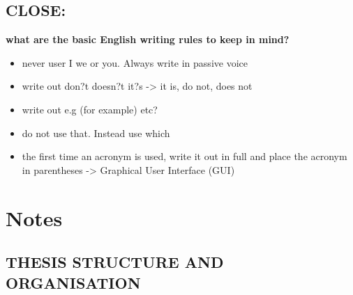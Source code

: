 \section{CLOSE:}
\textbf{what are the basic English writing rules to keep in mind?}\\
\begin{itemize}
\item never user I we or you. Always write in passive voice
\item write out don?t doesn?t it?s -> it is, do not, does not
\item write out e.g (for example) etc?
\item do not use that. Instead use which
\item the first time an acronym is used, write it out in full and place the acronym in parentheses -> Graphical User Interface (GUI)
\end{itemize}
\chapter{Notes}
\section{THESIS STRUCTURE AND ORGANISATION}
